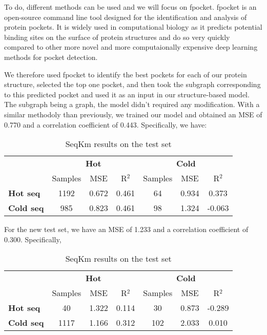 To do, different methods can be used and we will focus on fpocket. fpocket is an open-source command line
tool designed for the identification and analysis of protein pockets. It is widely used in computational
biology as it predicts potential binding sites on the surface of protein structures and do so very quickly
compared to other more novel and more computaionally expensive deep learning methods for pocket detection.

We therefore used fpocket to identify the best pockets for each of our protein structure, selected the top
one pocket, and then took the subgraph
corresponding to this predicted pocket and used it as an input in our structure-based model. The subgraph 
being a graph, the model didn't required any modification. With a similar methodoly than previously, we
trained our model and obtained an MSE of 0.770 and a correlation coefficient of 0.443. Specifically,
we have:

\begin{table}[ht]
  \centering
  \begin{tabular}{lcccccc}
  \hline
   & \multicolumn{3}{c}{\textbf{Hot}} & \multicolumn{3}{c}{\textbf{Cold}} \\
   & Samples & MSE & R\(^2\) & Samples & MSE & R\(^2\) \\ \hline
  \textbf{Hot seq}  & 1192 & 0.672 & 0.461 & 64 & 0.934 & 0.373 \\
  \textbf{Cold seq} & 985 & 0.823 & 0.461 & 98 & 1.324 & -0.063 \\ \hline
  \end{tabular}
  \caption{SeqKm results on the test set}
  \label{tab:results_pocket_test}
 \end{table}

For the new test set, we have an MSE of 1.233 and a correlation coefficient of 0.300. Specifically,

\begin{table}[ht]
  \centering
  \begin{tabular}{lcccccc}
  \hline
   & \multicolumn{3}{c}{\textbf{Hot}} & \multicolumn{3}{c}{\textbf{Cold}} \\
   & Samples & MSE & R\(^2\) & Samples & MSE & R\(^2\) \\ \hline
  \textbf{Hot seq}  & 40 & 1.322 & 0.114 & 30 & 0.873 & -0.289 \\
  \textbf{Cold seq}& 1117 & 1.166 & 0.312 & 102 & 2.033 & 0.010 \\ \hline
  \end{tabular}
  \caption{SeqKm results on the test set}
  \label{tab:results_pocket_new_test}
 \end{table}

